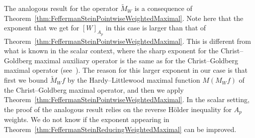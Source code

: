 \documentclass{article}
\theoremstyle{definition}
\theoremstyle{remark}
\numberwithin{equation}{section}
\newcommand{\1}{\mathbf{1}}
\begin{document}
    The analogous result for the operator $\widetilde{M}_W$ is a consequence of Theorem~\ref{thm:FeffermanSteinPointwiseWeightedMaximal}.
    Note here that the exponent that we get for $[W]_{A_p}$ in this case
    is larger than that of Theorem~\ref{thm:FeffermanSteinPointwiseWeightedMaximal}.
    This is different from what is known in the scalar context,
    where the sharp exponent for the Christ--Goldberg maximal auxiliary operator
    is the same as for the Christ--Goldberg maximal operator
    (see~\cite[Lemma~3.5]{Isralowitz_Moen_2019}).
    The reason for this larger exponent in our case is that first we bound
    $\widetilde{M}_W f$ by the Hardy--Littlewood maximal function $M(M_W f)$
    of the Christ--Goldberg maximal operator,
    and then we apply Theorem~\ref{thm:FeffermanSteinPointwiseWeightedMaximal}.
    In the scalar setting, the proof of the analogous result relies on
    the reverse Hölder inequality for $A_p$ weights.
    We do not know if the exponent appearing in
    Theorem~\ref{thm:FeffermanSteinReducingWeightedMaximal} can be improved.
\end{document}
